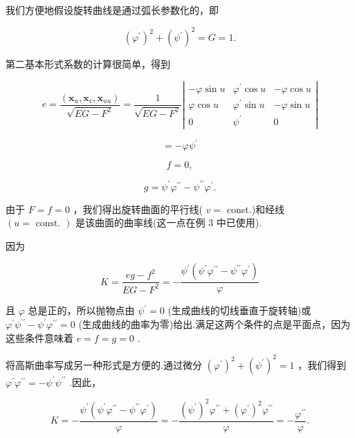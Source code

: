 我们方便地假设旋转曲线是通过弧长参数化的，即

\[
{\left( {\varphi }^{\prime }\right) }^{2} + {\left( {\psi }^{\prime }\right) }^{2} = G = 1.
\]

第二基本形式系数的计算很简单，得到

\[
e = \frac{\left( {\mathbf{x}}_{u},{\mathbf{x}}_{v},{\mathbf{x}}_{uu}\right) }{\sqrt{{EG} - {F}^{2}}} = \frac{1}{\sqrt{{EG} - {F}^{2}}}\left| \begin{matrix}  - \varphi \sin u & {\varphi }^{\prime }\cos u &  - \varphi \cos u \\  \varphi \cos u & {\varphi }^{\prime }\sin u &  - \varphi \sin u \\  0 & {\psi }^{\prime } & 0 \end{matrix}\right|
\]

\[
=  - \varphi {\psi }^{\prime }
\]

\[
f = 0,
\]

\[
g = {\psi }^{\prime }{\varphi }^{\prime \prime } - {\psi }^{\prime \prime }{\varphi }^{\prime }.
\]

由于 \(F = f = 0\) ，我们得出旋转曲面的平行线( \(v =\) const.)和经线 \(\left( {u = \text{ const. }}\right)\) 是该曲面的曲率线(这一点在例 3 中已使用).

因为

\[
K = \frac{{eg} - {f}^{2}}{{EG} - {F}^{2}} =  - \frac{{\psi }^{\prime }\left( {{\psi }^{\prime }{\varphi }^{\prime \prime } - {\psi }^{\prime \prime }{\varphi }^{\prime }}\right) }{\varphi }
\]

且 \(\varphi\) 总是正的，所以抛物点由 \({\psi }^{\prime } = 0\) (生成曲线的切线垂直于旋转轴)或 \({\varphi }^{\prime }{\psi }^{\prime \prime } - {\psi }^{\prime }{\varphi }^{\prime \prime } = 0\) (生成曲线的曲率为零)给出.满足这两个条件的点是平面点，因为这些条件意味着 \(e = f = g = 0\) .

将高斯曲率写成另一种形式是方便的.通过微分 \({\left( {\varphi }^{\prime }\right) }^{2} + {\left( {\psi }^{\prime }\right) }^{2} = 1\) ，我们得到 \({\varphi }^{\prime }{\varphi }^{\prime \prime } =  - {\psi }^{\prime }{\psi }^{\prime \prime }\) .因此，

\[
K =  - \frac{{\psi }^{\prime }\left( {{\psi }^{\prime }{\varphi }^{\prime \prime } - {\psi }^{\prime \prime }{\varphi }^{\prime }}\right) }{\varphi } =  - \frac{{\left( {\psi }^{\prime }\right) }^{2}{\varphi }^{\prime \prime } + {\left( {\varphi }^{\prime }\right) }^{2}{\varphi }^{\prime \prime }}{\varphi } =  - \frac{{\varphi }^{\prime \prime }}{\varphi }. \tag{9}
\]

